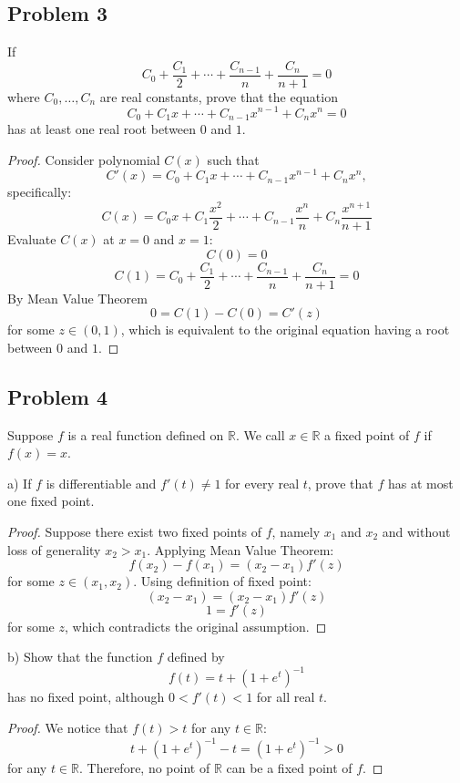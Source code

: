 \documentclass{article}
\begin{document}
\subsection*{Problem 3}

\begin{tcolorbox}
If
$$ C_0 + \frac{C_1}{2} + \cdots + \frac{C_{n-1}}{n} + \frac{C_n}{n+1} = 0 $$
where $C_0, \dots , C_n$ are real constants, prove that the equation
$$ C_0 + C_1 x + \cdots + C_{n-1} x^{n-1} + C_n x^n = 0 $$
has at least one real root between $0$ and $1$.
\end{tcolorbox}
\begin{proof}
Consider polynomial $C(x)$ such that
$$ C'(x) = C_0 + C_1 x + \cdots + C_{n-1} x^{n-1} + C_n x^n, $$ specifically:
$$ C(x) = C_0 x + C_1 \frac{x^2}{2} + \cdots + C_{n-1} \frac{x^n}{n} + C_n \frac{x^{n+1}}{n+1} $$
Evaluate $C(x)$ at $x=0$ and $x=1$:
$$ C(0) = 0 $$
$$ C(1) = C_0 + \frac{C_1}{2} + \cdots + \frac{C_{n-1}}{n} + \frac{C_n}{n+1} = 0 $$
By Mean Value Theorem
$$ 0 = C(1) - C(0) = C'(z) $$
for some $z \in (0,1)$, which is equivalent to the original equation having a root between $0$ and $1$.
\end{proof}

\subsection*{Problem 4}

\begin{tcolorbox}
Suppose $f$ is a real function defined on $\mathbb{R}$. We call $x \in \mathbb{R}$ a fixed point of $f$ if $f(x) = x$.

a) If $f$ is differentiable and $f'(t) \neq 1$ for every real $t$, prove that $f$ has at most one fixed point.
\end{tcolorbox}
\begin{proof}
Suppose there exist two fixed points of $f$, namely $x_1$ and $x_2$ and without loss of generality $x_2 > x_1$.
Applying Mean Value Theorem:
$$ f(x_2) - f(x_1) = (x_2 - x_1) f'(z) $$
for some $z \in (x_1, x_2)$. Using definition of fixed point:
$$ (x_2 - x_1) = (x_2 - x_1) f'(z) $$
$$ 1 = f'(z) $$
for some $z$, which contradicts the original assumption.
\end{proof}

\begin{tcolorbox}
b) Show that the function $f$ defined by
$$ f(t) = t+(1+e^t)^{-1} $$ 
has no fixed point, although $0 < f'(t) < 1$ for all real $t$.
\end{tcolorbox}
\begin{proof}
We notice that $f(t) > t$ for any $t \in \mathbb{R}$:
$$  t+(1+e^t)^{-1} - t = (1+e^t)^{-1} > 0 $$
for any $t \in \mathbb{R}$.
Therefore, no point of $\mathbb{R}$ can be a fixed point of $f$.
\end{proof}
\end{document}
